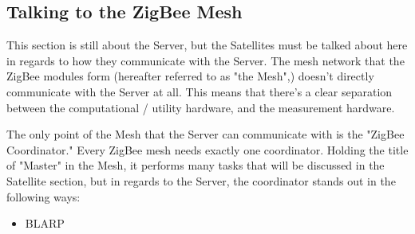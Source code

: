 
\subsection{Talking to the ZigBee Mesh}
This section is still about the Server, but the Satellites must be talked about here in
regards to how they communicate with the Server. The mesh network that the ZigBee modules
form (hereafter referred to as "the Mesh",) doesn't directly communicate with the Server
at all. This means that there's a clear separation between the computational / utility
hardware, and the measurement hardware.

The only point of the Mesh that the Server can communicate with is the "ZigBee Coordinator."
Every ZigBee mesh needs exactly one coordinator. Holding the title of "Master" in the
Mesh, it performs many tasks that will be discussed in the Satellite section, but in regards
to the Server, the coordinator stands out in the following ways:

\begin{itemize}
	\item BLARP
\end{itemize}

